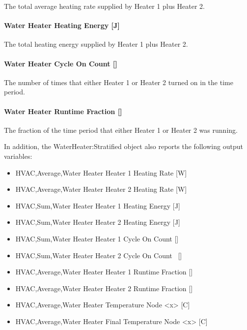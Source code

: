 The total average heating rate supplied by Heater 1 plus Heater 2.

\paragraph{Water Heater Heating Energy {[}J{]}}\label{water-heater-heating-energy-j-1}

The total heating energy supplied by Heater 1 plus Heater 2.

\paragraph{Water Heater Cycle On Count {[]}}\label{water-heater-cycle-on-count-1}

The number of times that either Heater 1 or Heater 2 turned on in the time period.

\paragraph{Water Heater Runtime Fraction {[]}}\label{water-heater-runtime-fraction-1}

The fraction of the time period that either Heater 1 or Heater 2 was running.

In addition, the WaterHeater:Stratified object also reports the following output variables:

\begin{itemize}
\item
  HVAC,Average,Water Heater Heater 1 Heating Rate {[}W{]}
\item
  HVAC,Average,Water Heater Heater 2 Heating Rate {[}W{]}
\item
  HVAC,Sum,Water Heater Heater 1 Heating Energy {[}J{]}
\item
  HVAC,Sum,Water Heater Heater 2 Heating Energy {[}J{]}
\item
  HVAC,Sum,Water Heater Heater 1 Cycle On Count {[]}
\item
  HVAC,Sum,Water Heater Heater 2 Cycle On Count~ {[]}
\item
  HVAC,Average,Water Heater Heater 1 Runtime Fraction {[]}
\item
  HVAC,Average,Water Heater Heater 2 Runtime Fraction {[]}
\item
  HVAC,Average,Water Heater Temperature Node \textless{}x\textgreater{} {[}C{]}
\item
  HVAC,Average,Water Heater Final Temperature Node \textless{}x\textgreater{} {[}C{]}
\end{itemize}

